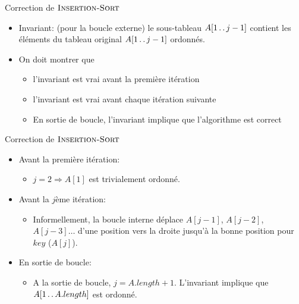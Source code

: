 \begin{frame}{Correction de $\textnormal{\scshape Insertion-Sort}$}

\begin{center}
\end{center}

\bigskip
\begin{itemize}
\item \alert{Invariant:} (pour la boucle externe) le sous-tableau $A[1\mathinner{\ldotp\ldotp} j-1]$ contient les éléments du tableau original $A[1\mathinner{\ldotp\ldotp} j-1]$ ordonnés.
\item On doit montrer que
\begin{itemize}
\item l'invariant est vrai avant la première itération %
\item l'invariant est vrai avant chaque itération suivante %
\item En sortie de boucle, l'invariant implique que l'algorithme est correct %
\end{itemize}
\end{itemize}
\end{frame}

\begin{frame}{Correction de $\textnormal{\scshape Insertion-Sort}$}
\begin{itemize}
\item Avant la première itération:
\begin{itemize}
\item $j=2 \Rightarrow A[1]$ est trivialement ordonné.
\end{itemize}
\bigskip
\item Avant la $j$ème itération:
\begin{itemize}
\item Informellement, la boucle interne déplace $A[j-1]$, $A[j-2]$, $A[j-3]\ldots$ d'une position vers la droite jusqu'à la bonne position pour $key$ ($A[j]$).
\end{itemize}
\bigskip
\item En sortie de boucle:
\begin{itemize}
\item A la sortie de boucle, $j=A.length+1$. L'invariant implique que $A[1\mathinner{\ldotp\ldotp} A.length]$ est ordonné.
\end{itemize}
\end{itemize}
\end{frame}

